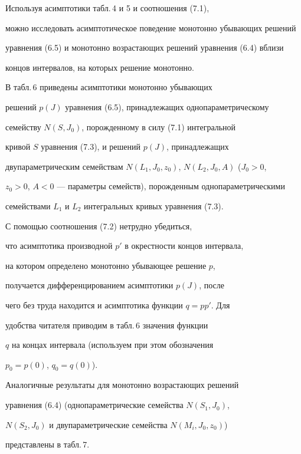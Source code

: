  


Используя асимптотики табл.\,4 и 5 и соотношения (7.1),  


можно исследовать асимптотическое поведение монотонно убывающих решений  


уравнения (6.5) и монотонно возрастающих решений уравнения (6.4) вблизи  


концов интервалов, на которых решение монотонно. 


 


В табл.\,6 приведены асимптотики монотонно убывающих  


решений $p(J)$ уравнения (6.5), принадлежащих однопараметрическому  


семейству $N(S,J_0)$, порожденному в силу (7.1) интегральной  


кривой $S$ уравнения (7.3), и решений $p(J)$, принадлежащих  


двупараметрическим семействам $N(L_1,J_0,z_0)$, $N(L_2,J_0,A)$ ($J_0>0$, 


$z_0>0$, $A<0$ --- параметры семейств), порожденным однопараметрическими  


семействами $L_1$ и $L_2$ интегральных кривых уравнения (7.3). 


 


С помощью соотношения (7.2) нетрудно убедиться,  


что асимптотика производной $p'$ в окрестности концов интервала, 


на котором определено монотонно убывающее решение $p$, 


получается дифференцированием асимптотики $p(J)$, после 


чего без труда находится и асимптотика функции $q=pp'$. Для  


удобства читателя приводим в табл.\,6 значения функции  


$q$ на концах интервала (используем при этом обозначения 


$p_0=p(0)$, $q_0=q(0)$). 


 


Аналогичные результаты для монотонно возрастающих решений  


уравнения (6.4) (однопараметрические семейства $N(S_1,J_0)$, 


$N(S_2,J_0)$ и двупараметрические семейства $N(M_i,J_0,z_0)$) 


представлены в табл.\,7. 


